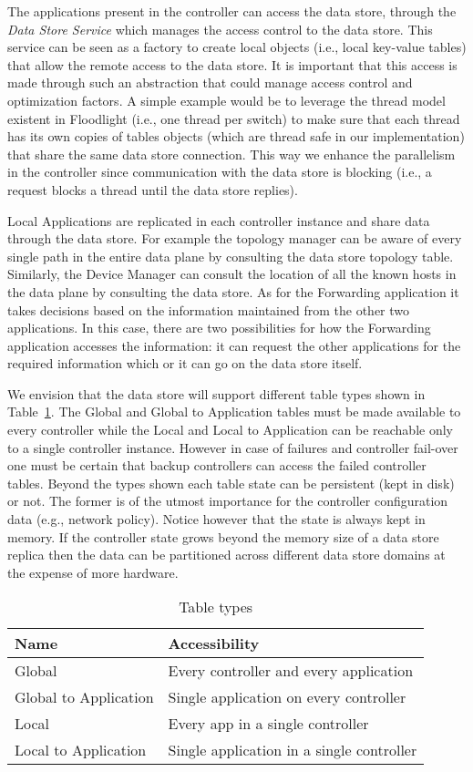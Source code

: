 The applications present in the controller can access the data store, through the \emph{Data Store Service}  which manages the access control to the data store. 
This service can be seen as a factory to create local objects (i.e., local key-value tables) that allow the remote access to the data store. 
It is important that this access is made through such an abstraction that could manage access control and optimization factors. 
A simple example would be to leverage the thread model existent in Floodlight (i.e., one thread per switch) to make sure that each thread has its own copies of tables objects (which are thread safe in our implementation) that share the same data store connection. 
This way we enhance the parallelism in the controller since communication with the data store is blocking (i.e., a request blocks a thread until the data store replies). 

Local Applications are replicated in each controller instance and share data through the data store. For example the topology manager can be aware of every single path in the entire data plane by consulting the data store topology table. Similarly, the Device Manager can consult the location of all the known hosts in the data plane by consulting the data store. As for the Forwarding application it takes decisions based on the information maintained from the other two applications. 
In this case, there are two possibilities for how the Forwarding application accesses the information: it can request the other applications for the required information which or it can go on the data store itself.

We envision that the data store will support different table types shown in Table~\ref{tab:table-types}. The Global and Global to Application tables must be made available to every controller while the Local and Local to Application can be reachable only to a single controller instance. However in case of failures and controller fail-over one must be certain that backup controllers can access the failed controller tables. Beyond the types shown each table state can be persistent (kept in disk) or not. The former is of the utmost importance for the controller configuration data (e.g., network policy). Notice however that the state is always kept in memory. If the controller state grows beyond the memory size  of a data store replica then the data can be partitioned across different data store domains at the expense of more hardware. 

\begin{table}[ht]
  \centering
  \begin{tabular}{ll}
    Name & Accessibility \\ \toprule 
    Global & Every controller and every application   \\ 
    Global to Application & Single application on every controller \\
    Local & Every app in a single controller \\
    Local to Application &  Single application in a single controller \\ \bottomrule 
  \end{tabular}
  \caption{Table types}
  \label{tab:table-types}
\end{table}

